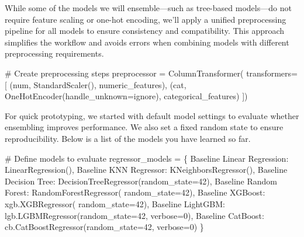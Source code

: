 \documentclass[
  letterpaper,
  DIV=11,
  numbers=noendperiod]{scrreprt}
\newenvironment{Shaded}{\begin{snugshade}}{\end{snugshade}}
\newcommand{\CommentTok}[1]{\textcolor[rgb]{0.37,0.37,0.37}{#1}}
\newcommand{\DecValTok}[1]{\textcolor[rgb]{0.68,0.00,0.00}{#1}}
\newcommand{\NormalTok}[1]{\textcolor[rgb]{0.00,0.23,0.31}{#1}}
\newcommand{\OperatorTok}[1]{\textcolor[rgb]{0.37,0.37,0.37}{#1}}
\newcommand{\StringTok}[1]{\textcolor[rgb]{0.13,0.47,0.30}{#1}}
\begin{document}
While some of the models we will ensemble---such as tree-based
models---do not require feature scaling or one-hot encoding, we'll apply
a unified preprocessing pipeline for all models to ensure consistency
and compatibility. This approach simplifies the workflow and avoids
errors when combining models with different preprocessing requirements.

\begin{Shaded}
\begin{Highlighting}[]
\CommentTok{\# Create preprocessing steps}
\NormalTok{preprocessor }\OperatorTok{=}\NormalTok{ ColumnTransformer(}
\NormalTok{    transformers}\OperatorTok{=}\NormalTok{[}
\NormalTok{        (}\StringTok{\textquotesingle{}num\textquotesingle{}}\NormalTok{, StandardScaler(), numeric\_features),}
\NormalTok{        (}\StringTok{\textquotesingle{}cat\textquotesingle{}}\NormalTok{, OneHotEncoder(handle\_unknown}\OperatorTok{=}\StringTok{\textquotesingle{}ignore\textquotesingle{}}\NormalTok{), categorical\_features)}
\NormalTok{    ])}
\end{Highlighting}
\end{Shaded}

For quick prototyping, we started with default model settings to
evaluate whether ensembling improves performance. We also set a fixed
random state to ensure reproducibility. Below is a list of the models
you have learned so far.

\begin{Shaded}
\begin{Highlighting}[]
\CommentTok{\# Define models to evaluate}
\NormalTok{regressor\_models }\OperatorTok{=}\NormalTok{ \{}
    \StringTok{\textquotesingle{}Baseline Linear Regression\textquotesingle{}}\NormalTok{: LinearRegression(),}
    \StringTok{\textquotesingle{}Baseline KNN Regressor\textquotesingle{}}\NormalTok{: KNeighborsRegressor(),}
    \StringTok{\textquotesingle{}Baseline Decision Tree\textquotesingle{}}\NormalTok{: DecisionTreeRegressor(random\_state}\OperatorTok{=}\DecValTok{42}\NormalTok{),}
    \StringTok{\textquotesingle{}Baseline Random Forest\textquotesingle{}}\NormalTok{: RandomForestRegressor( random\_state}\OperatorTok{=}\DecValTok{42}\NormalTok{),}
    \StringTok{\textquotesingle{}Baseline XGBoost\textquotesingle{}}\NormalTok{: xgb.XGBRegressor( random\_state}\OperatorTok{=}\DecValTok{42}\NormalTok{),}
    \StringTok{\textquotesingle{}Baseline LightGBM\textquotesingle{}}\NormalTok{: lgb.LGBMRegressor(random\_state}\OperatorTok{=}\DecValTok{42}\NormalTok{, verbose}\OperatorTok{=}\DecValTok{0}\NormalTok{),}
    \StringTok{\textquotesingle{}Baseline CatBoost\textquotesingle{}}\NormalTok{: cb.CatBoostRegressor(random\_state}\OperatorTok{=}\DecValTok{42}\NormalTok{, verbose}\OperatorTok{=}\DecValTok{0}\NormalTok{)}
\NormalTok{\}}
\end{Highlighting}
\end{Shaded}
\end{document}
